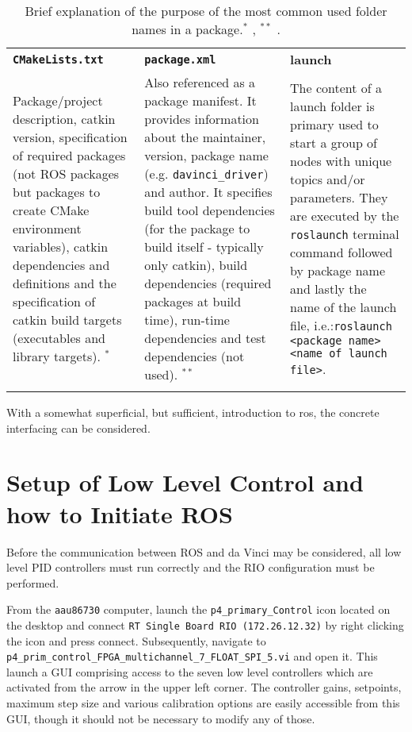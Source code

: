 \begin{table}[H]
\begin{tabularx}{\textwidth}{X X X}
\rowcolor{HeaderBlue} 
 \textbf{\texttt{CMakeLists.txt}} & \textbf{\texttt{package.xml}}& \textbf{launch} \\
Package/project description, \gls{catkin} version, specification of required packages (not ROS packages but packages to create CMake environment variables), catkin dependencies and definitions and the specification of catkin build targets (executables and library targets). 
$^*$  & Also referenced as a package manifest. It provides information about the maintainer, version, package name (e.g. \texttt{davinci\_driver}) and author. It specifies build tool dependencies (for the package to build itself - typically only catkin), build dependencies (required packages at build time), run-time dependencies and test dependencies (not used).  $^{**}$ & The content of a launch folder is primary used to start a group of nodes with unique topics and/or parameters. They are executed by the \texttt{roslaunch} terminal command followed by package name and lastly the name of the launch file, i.e.:\newline \texttt{roslaunch <package name> <name of launch file>}. \\  \rowcolor{textBlue}
\end{tabularx}
	\caption{Brief explanation of the purpose of the most common used folder names in a package.\newline $^*$ \citep{bib:CmakeLists}, $^{**}$ \citep{bib:package}.} 
\label{tab:eleb}
\end{table}
\vspace{-0.2cm}
With a somewhat superficial, but sufficient, introduction to \gls{ros}, the concrete interfacing can be considered.
\vspace{-0.4cm}
\section{Setup of Low Level Control and how to Initiate ROS}\label{sec:init_ROS}
\vspace{-0.2cm}
Before the communication between ROS and da Vinci may be considered, all low level PID controllers must run correctly and the RIO configuration must be performed. 

From the \texttt{aau86730} computer, launch the \texttt{p4\_primary\_Control} icon located on the desktop and connect \texttt{RT Single Board RIO (172.26.12.32)} by right clicking the icon and press connect. Subsequently, navigate to \texttt{p4\_prim\_control\_FPGA\_multichannel\_7\_FLOAT\_SPI\_5.vi} and open it. This launch a GUI comprising access to the seven low level controllers which are activated from the arrow in the upper left corner. The controller gains, setpoints, maximum step size and various calibration options are easily accessible from this GUI, though it should not be necessary to modify any of those. 

